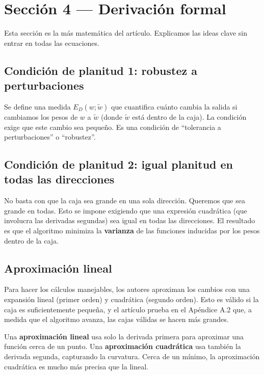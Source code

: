 \documentclass[11pt,a4paper]{article}
\newcounter{definicion}
\newenvironment{definicion}[1][]{%
  \refstepcounter{definicion}%
  \begin{tcolorbox}[colback=grisclaro,colframe=verdecorado,title=Definición \thedefinicion: #1,breakable]}%
  {\end{tcolorbox}}
\begin{document}
\section{Sección 4 — Derivación formal}
\label{sec:sec4}

Esta sección es la más matemática del artículo. Explicamos las ideas clave sin entrar en todas las ecuaciones.

\subsection{Condición de planitud 1: robustez a perturbaciones}

Se define una medida $E_D(w; \tilde{w})$ que cuantifica cuánto cambia la salida si cambiamos los pesos de $w$ a $\tilde{w}$ (donde $\tilde{w}$ está dentro de la caja). La condición exige que este cambio sea pequeño. Es una condición de ``tolerancia a perturbaciones'' o ``robustez''.

\subsection{Condición de planitud 2: igual planitud en todas las direcciones}

No basta con que la caja sea grande en una sola dirección. Queremos que sea grande en todas. Esto se impone exigiendo que una expresión cuadrática (que involucra las derivadas segundas) sea igual en todas las direcciones. El resultado es que el algoritmo minimiza la \textbf{varianza} de las funciones inducidas por los pesos dentro de la caja.

\subsection{Aproximación lineal}

Para hacer los cálculos manejables, los autores aproximan los cambios con una expansión lineal (primer orden) y cuadrática (segundo orden). Esto es válido si la caja es suficientemente pequeña, y el artículo prueba en el Apéndice A.2 que, a medida que el algoritmo avanza, las cajas válidas se hacen más grandes.

\begin{definicion}[Aproximación lineal y cuadrática]
Una \textbf{aproximación lineal} usa solo la derivada primera para aproximar una función cerca de un punto. Una \textbf{aproximación cuadrática} usa también la derivada segunda, capturando la curvatura. Cerca de un mínimo, la aproximación cuadrática es mucho más precisa que la lineal.
\end{definicion}
\end{document}
